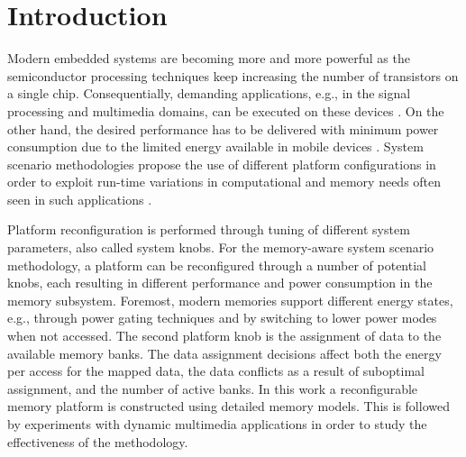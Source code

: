 \documentclass[smallextended]{svjour3}
\begin{document}
\section{Introduction}
\label{sec:introduction}

Modern embedded systems are becoming more and more powerful as the semiconductor processing techniques keep increasing the number of transistors on a single chip. 
Consequentially, demanding applications, e.g., in the signal processing and multimedia domains, can be executed on these devices \cite{narasinga}. 
On the other hand, the desired performance has to be delivered with minimum power consumption due to the limited energy available in mobile devices \cite{tcm}. 
System scenario methodologies propose the use of different platform configurations in order to exploit run-time variations in computational and memory needs often seen in such applications \cite{tcm}.

Platform reconfiguration is performed through tuning of different system parameters, also called system knobs. 
For the memory-aware system scenario methodology, a platform can be reconfigured through a number of potential knobs, each resulting in different performance and power consumption in the memory subsystem. 
Foremost, modern memories support different energy states, e.g., through power gating techniques and by switching to lower power modes when not accessed. 
The second platform knob is the assignment of data to the available memory banks.
The data assignment decisions affect both the energy per access for the mapped data, the data conflicts as a result of suboptimal assignment, and the number of active banks. 
In this work a reconfigurable memory platform is constructed using detailed memory models. 
This is followed by experiments with dynamic multimedia applications in order to study the effectiveness of the methodology.
\end{document}
